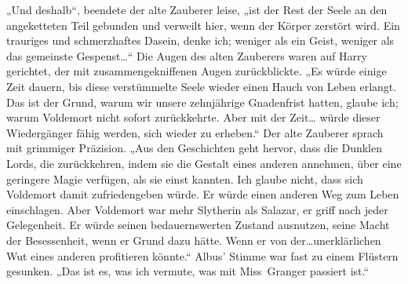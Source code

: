„Und deshalb“, beendete der alte Zauberer leise, „ist der Rest der Seele an den angeketteten Teil gebunden und verweilt hier, wenn der Körper zerstört wird. Ein trauriges und schmerzhaftes Dasein, denke ich; weniger als ein Geist, weniger als das gemeinste Gespenst…“
Die Augen des alten Zauberers waren auf Harry gerichtet, der mit zusammengekniffenen Augen zurückblickte.
„Es würde einige Zeit dauern, bis diese verstümmelte Seele wieder einen Hauch von Leben erlangt. Das ist der Grund, warum wir unsere zehnjährige Gnadenfrist hatten, glaube ich; warum Voldemort nicht sofort zurückkehrte. Aber mit der Zeit… würde dieser Wiedergänger fähig werden, sich wieder zu erheben.“
Der alte Zauberer sprach mit grimmiger Präzision.
„Aus den Geschichten geht hervor, dass die Dunklen Lords, die zurückkehren, indem sie die Gestalt eines anderen annehmen, über eine geringere Magie verfügen, als sie einst kannten. Ich glaube nicht, dass sich Voldemort damit zufriedengeben würde. Er würde einen anderen Weg zum Leben einschlagen. Aber Voldemort war mehr Slytherin als Salazar, er griff nach jeder Gelegenheit. Er würde seinen bedauernswerten Zustand ausnutzen, seine Macht der Besessenheit, wenn er Grund dazu hätte. Wenn er von der…unerklärlichen Wut eines anderen profitieren könnte.“ Albus' Stimme war fast zu einem Flüstern gesunken.
„Das ist es, was ich vermute, was mit Miss~Granger passiert ist.“

